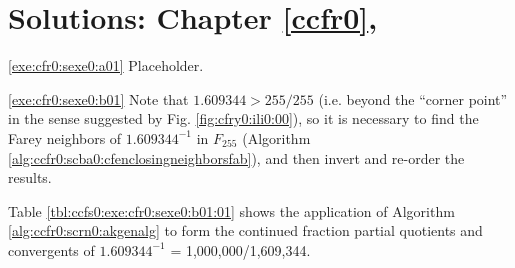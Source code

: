 \chapter[Solutions: Chapter \ref{ccfr0}]
        {Solutions: Chapter \ref{ccfr0}, \ccfrzerolongtitle{}}

\label{ccfs0}

\vworkexercisechapterheader{}
\begin{vworkexercisesolution}{\ref{exe:cfr0:sexe0:a01}}
Placeholder.

\end{vworkexercisesolution}
\vworkexerciseseparator
\begin{vworkexercisesolution}{\ref{exe:cfr0:sexe0:b01}}
Note that $1.609344 > 255/255$ (i.e. beyond the ``corner point''
in the sense suggested by Fig. \ref{fig:cfry0:ili0:00}), 
so it is necessary to find
the Farey neighbors of $1.609344^{-1}$ in $F_{255}$
(Algorithm \ref{alg:ccfr0:scba0:cfenclosingneighborsfab}),
and then invert and re-order the results.

Table \ref{tbl:ccfs0:exe:cfr0:sexe0:b01:01} 
shows the application of 
Algorithm \ref{alg:ccfr0:scrn0:akgenalg}
to form the continued fraction partial quotients and
convergents of $1.609344^{-1}$ = 1,000,000/1,609,344.


\end{vworkexercisesolution}
